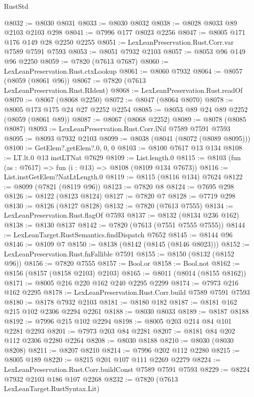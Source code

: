 \begin{lexlean}{RustStd}
\begin{coremodule}
{\begin{coremodule}
{{{{{{{{{{{{{{{{{{{{{{{{{{{{{{{{{{@8032 := @8030 @8031
@8033 := @8030 @8032
@8038 := @8028 @8033 @89 @2103 @2103 @298
@8041 := @7996 @177 @8023 @2256
@8047 := @8005 @171 @176 @149 @28 @2250 @2255
@8051 := LexLeanPreservation.Rust.Corr.var @7589 @7591 @7593
@8053 := @8051 @7932 @2103
@8057 := @8053 @96 @149 @96 @2250
@8059 := @7820 (@7613 @7687)
@8060 := LexLeanPreservation.Rust.ctxLookup
@8061 := @8060 @7932
@8064 := @8057 (@8059 (@8061 @96))
@8067 := @7820 (@7613 LexLeanPreservation.Rust.RIdent)
@8068 := LexLeanPreservation.Rust.readOf
@8070 := @8067 (@8068 @2250)
@8072 := @8047 (@8064 @8070)
@8078 := @8005 @173 @175 @24 @27 @2252 @2254
@8085 := @8053 @89 @24 @89 @2252 (@8059 (@8061 @89))
@8087 := @8067 (@8068 @2252)
@8089 := @8078 (@8085 @8087)
@8093 := LexLeanPreservation.Rust.Corr.lNil @7589 @7591 @7593
@8095 := @8093 @7932 @2103
@8099 := @8038 (@8041 (@8072 (@8089 @8095)))
@8100 := GetElem?.getElem?.{0, 0, 0}
@8103 := @8100 @7617 @13 @134
@8108 := LT.lt.{0} @13 instLTNat @7629
@8109 := List.length.{0}
@8115 := @8103 (fun (as : @7617) => fun (i : @13) => @8108 (@8109 @134 @7673))
@8116 := List.instGetElem?NatLtLength.{0}
@8119 := @8115 (@8116 @134) @7624
@8122 := @8099 (@7821 (@8119 @96))
@8123 := @7820 @8
@8124 := @7695 @298
@8126 := @8122 (@8123 @8124)
@8127 := @7820 @7
@8128 := @7719 @298
@8130 := @8126 (@8127 @8128)
@8132 := @7820 (@7613 @7555)
@8134 := LexLeanPreservation.Rust.flagOf @7593
@8137 := @8132 (@8134 @236 @162)
@8138 := @8130 @8137
@8142 := @7820 (@7613 (@7551 @7555 @7555))
@8144 := LexLeanTarget.RustSemantics.findDispatch @7652
@8145 := @8144 @96
@8146 := @8109 @7
@8150 := @8138 (@8142 (@8145 (@8146 @8023)))
@8152 := LexLeanPreservation.Rust.fnFallible @7591
@8155 := @8150 (@8132 (@8152 @96))
@8156 := @7820 @7555
@8157 := Bool.or
@8158 := Bool.not
@8162 := @8156 (@8157 (@8158 @2103) @2103)
@8165 := @8011 (@8014 (@8155 @8162))
@8171 := @8005 @216 @220 @162 @240 @2295 @2299
@8174 := @7973 @216 @162 @2295
@8178 := LexLeanPreservation.Rust.Corr.build @7589 @7591 @7593
@8180 := @8178 @7932 @2103
@8181 := @8180 @182
@8187 := @8181 @162 @215 @102 @2306 @2294 @2261
@8188 := @8030 @8033
@8189 := @8187 @8188
@8192 := @7996 @215 @102 @2294
@8198 := @8005 @203 @214 @84 @101 @2281 @2293
@8201 := @7973 @203 @84 @2281
@8207 := @8181 @84 @202 @112 @2306 @2280 @2264
@8208 := @8030 @8188
@8210 := @8030 (@8030 @8208)
@8211 := @8207 @8210
@8214 := @7996 @202 @112 @2280
@8215 := @8005 @189
@8220 := @8215 @201 @107 @111 @2269 @2279
@8224 := LexLeanPreservation.Rust.Corr.buildConst @7589 @7591 @7593
@8229 := @8224 @7932 @2103 @186 @107 @2268
@8232 := @7820 (@7613 LexLeanTarget.RustSyntax.Lit)
}}}}}}}}}}}}}}}}}}}}}}}}}}}}}}}}}}
\end{coremodule}}
\end{coremodule}
\end{lexlean}
